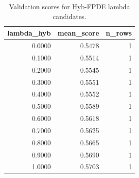 \begin{table}[t]
\caption{Validation scores for Hyb-FPDE lambda candidates.}
\label{tab:lambda_distribution_computed}
\centering
\begin{tabular}{rrr}
\toprule
lambda\_hyb & mean\_score & n\_rows \\
\midrule
0.0000 & 0.5478 & 1 \\
0.1000 & 0.5514 & 1 \\
0.2000 & 0.5545 & 1 \\
0.3000 & 0.5551 & 1 \\
0.4000 & 0.5552 & 1 \\
0.5000 & 0.5589 & 1 \\
0.6000 & 0.5618 & 1 \\
0.7000 & 0.5625 & 1 \\
0.8000 & 0.5665 & 1 \\
0.9000 & 0.5690 & 1 \\
1.0000 & 0.5703 & 1 \\
\bottomrule
\end{tabular}

\end{table}

